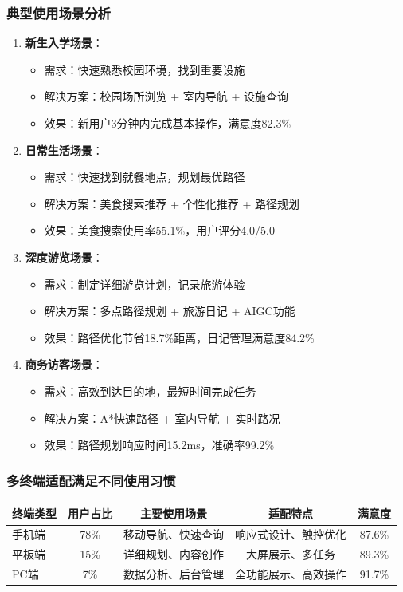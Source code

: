 \documentclass[12pt,a4paper]{article}
\begin{document}
\subsubsection{典型使用场景分析}
\begin{enumerate}
    \item \textbf{新生入学场景}：
    \begin{itemize}
        \item 需求：快速熟悉校园环境，找到重要设施
        \item 解决方案：校园场所浏览 + 室内导航 + 设施查询
        \item 效果：新用户3分钟内完成基本操作，满意度82.3\%
    \end{itemize}
    
    \item \textbf{日常生活场景}：
    \begin{itemize}
        \item 需求：快速找到就餐地点，规划最优路径
        \item 解决方案：美食搜索推荐 + 个性化推荐 + 路径规划
        \item 效果：美食搜索使用率55.1\%，用户评分4.0/5.0
    \end{itemize}
    
    \item \textbf{深度游览场景}：
    \begin{itemize}
        \item 需求：制定详细游览计划，记录旅游体验
        \item 解决方案：多点路径规划 + 旅游日记 + AIGC功能
        \item 效果：路径优化节省18.7\%距离，日记管理满意度84.2\%
    \end{itemize}
    
    \item \textbf{商务访客场景}：
    \begin{itemize}
        \item 需求：高效到达目的地，最短时间完成任务
        \item 解决方案：A*快速路径 + 室内导航 + 实时路况
        \item 效果：路径规划响应时间15.2ms，准确率99.2\%
    \end{itemize}
\end{enumerate}

\subsubsection{多终端适配满足不同使用习惯}
\begin{center}
\begin{tabular}{|l|c|c|c|c|}
\hline
\textbf{终端类型} & \textbf{用户占比} & \textbf{主要使用场景} & \textbf{适配特点} & \textbf{满意度} \\
\hline
手机端 & 78\% & 移动导航、快速查询 & 响应式设计、触控优化 & 87.6\% \\
平板端 & 15\% & 详细规划、内容创作 & 大屏展示、多任务 & 89.3\% \\
PC端 & 7\% & 数据分析、后台管理 & 全功能展示、高效操作 & 91.7\% \\
\hline
\end{tabular}
\end{center}
\end{document}
